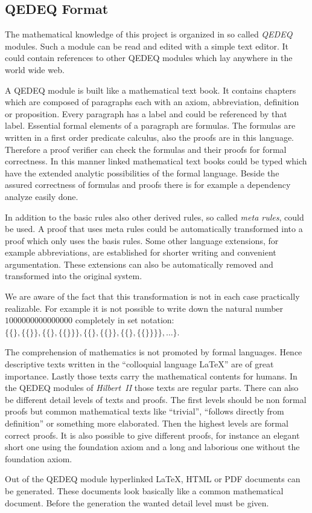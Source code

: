 \documentclass[a4paper,german,10pt,twoside]{book}
\theoremstyle{definition}
\theoremstyle{remark}
\begin{document}
\subsection{QEDEQ Format
}
The mathematical knowledge of this project is organized in so called \emph{QEDEQ} modules. Such a module can be read and edited with a simple text editor. It could contain references to other QEDEQ modules which lay anywhere in the world wide web.
\par
A QEDEQ module is built like a mathematical text book. It contains chapters which are composed of paragraphs each with an axiom, abbreviation, definition or proposition. Every paragraph has a label and could be referenced by that label. Essential formal elements of a paragraph are formulas. The formulas are written in a first order predicate calculus, also the proofs are in this language. Therefore a proof verifier can check the formulas and their proofs for formal correctness. In this manner linked mathematical text books could be typed which have the extended analytic possibilities of the formal language. Beside the assured correctness of formulas and proofs there is for example a dependency analyze easily done.
\par
In addition to the basic rules also other derived rules, so called \emph{meta rules}, could be used. A proof that uses meta rules could be automatically transformed into a proof which only uses the basis rules. Some other language extensions, for example abbreviations, are established for shorter writing and convenient argumentation. These extensions can also be automatically removed and transformed into the original system.
\par
We are aware of the fact that this transformation is not in each case practically realizable. For example it is not possible to write down the natural number $1000000000000000$ completely in set notation: $\{\{\}, \{\{\}\}, \{\{\}, \{\{\}\}\}, \{\{\}, \{\{\}\}, \{\{\}, \{\{\}\}\}\}, \ldots \}$.
\par
The comprehension of mathematics is not promoted by formal languages. Hence descriptive texts written in the ``colloquial language \LaTeX{}''\index{\LaTeX{}} are of great importance. Lastly those texts carry the mathematical contents for humans. In the QEDEQ modules of \emph{Hilbert~II} those texts are regular parts. There can also be different detail levels of texts and proofs. The first levels should be non formal proofs but common mathematical texts like ``trivial'', ``follows directly from definition'' or something more elaborated. Then the highest levels are formal correct proofs. It is also possible to give different proofs, for instance an elegant short one using the foundation axiom and a long and laborious one without the foundation axiom.
\par
Out of the QEDEQ module hyperlinked \LaTeX{}, HTML or PDF documents can be generated. These documents look basically like a common mathematical document. Before the generation the wanted detail level must be given.
\end{document}

